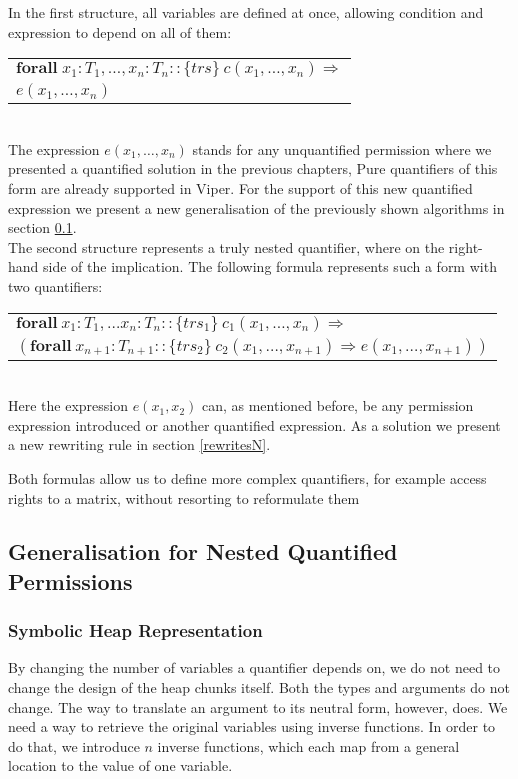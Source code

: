 \documentclass[12pt]{article}
\begin{document}
In the first structure, all variables are defined at once, allowing condition and expression to depend on all of them:\\

\begin{tabularx}{1\textwidth}{ X }
	\( \mathbf{forall} \; x_1:T_1, \dots, x_n: T_n ::  \{trs\}\ c(x_1, \dots, x_n) \Rightarrow \) \\
	\(e(x_1,  \dots, x_n)\)
\end{tabularx}\\

The expression \(e(x_1,  \dots, x_n)\) stands for any unquantified permission where we presented a quantified solution in the previous chapters, Pure quantifiers of this form are already supported in Viper. For the support of this new quantified expression we present a new generalisation of the previously shown algorithms in section \ref{generalN}.\\

The second structure represents a truly nested quantifier, where on the right-hand side of the implication. The following formula represents such a form with two quantifiers:\\

\begin{tabularx}{1\textwidth}{ X}
      \(\mathbf{forall \ }  x_1:T_1, \dots x_n:T_n ::  \{trs_1\}\  c_1(x_1, \dots, x_n) \Rightarrow \) \\
     \( ( \mathbf{forall \ } x_{n+1}:T_{n+1} :: \{trs_2\} \ c_2(x_1, \dots, x_{n+1}) \Rightarrow e(x_1, \dots, x_{n+1}))\)
\end{tabularx}\\

Here the expression \(e(x_1, x_2)\) can, as mentioned before, be any permission expression introduced or another quantified expression. As a solution we present a new rewriting rule in section \ref{rewritesN}.

Both formulas allow us to define more complex quantifiers, for example access rights to a matrix, without resorting to reformulate them 

\subsection{Generalisation for Nested Quantified Permissions}
\label{generalN}




\subsubsection{Symbolic Heap Representation} \label{shr}
By changing the number of variables a quantifier depends on, we do not need to change the design of the heap chunks itself. Both the types and arguments do not change. The way to translate an argument to its neutral form, however, does. We need a way to retrieve the original variables using inverse functions. In order to do that, we introduce \(n\) inverse functions, which each map from a general location to the value of one variable.
\end{document}
